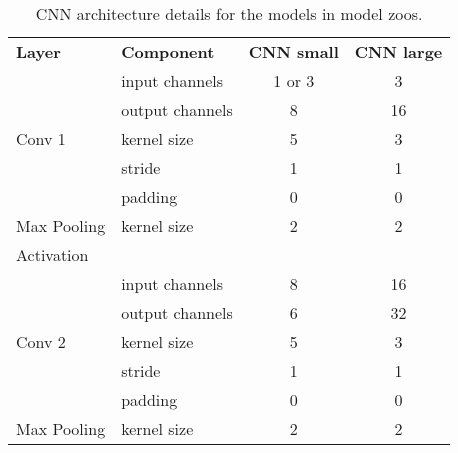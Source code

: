 \begin{table}[h!]
    \centering
    \begin{minipage}{0.8\textwidth}
    \centering
    {\small
    \caption{CNN architecture details for the models in model zoos. }
    \label{tab:model_zoo_architecture}
    \begin{tabular}{@{}llcc@{}}
        \toprule
        \textbf{Layer}          & \textbf{Component} & \textbf{CNN small} & \textbf{CNN large} \\
        \cmidrule(r){1-1} \cmidrule(rl){2-2}  \cmidrule(rl){3-3}  \cmidrule(rl){4-4}
        \multirow{5}{*}{Conv 1} & input channels     & 1 or 3          & 3       \\
                                & output channels    & 8            & 16        \\
                                & kernel size        & 5            & 3        \\
                                & stride             & 1            & 1        \\
                                & padding            & 0            & 0        \\
        \cmidrule(r){1-1} \cmidrule(rl){2-2}  \cmidrule(rl){3-3}  \cmidrule(rl){4-4}
        Max Pooling             & kernel size        & 2            & 2        \\
        \cmidrule(r){1-1} \cmidrule(rl){2-2}  \cmidrule(rl){3-3}  \cmidrule(rl){4-4}
        Activation              &                    &                      \\
        \cmidrule(r){1-1} \cmidrule(rl){2-2}  \cmidrule(rl){3-3}  \cmidrule(rl){4-4}
        \multirow{5}{*}{Conv 2} & input channels     & 8            & 16        \\
                                & output channels    & 6            & 32        \\
                                & kernel size        & 5            & 3         \\
                                & stride             & 1            & 1        \\
                                & padding            & 0            & 0        \\
        \cmidrule(r){1-1} \cmidrule(rl){2-2}  \cmidrule(rl){3-3}  \cmidrule(rl){4-4}
        Max Pooling             & kernel size        & 2            & 2        \\

\end{tabular}}
\end{minipage}
\end{table}
